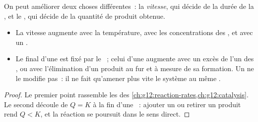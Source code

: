 On peut améliorer deux choses différentes~: la \emph{vitesse}, qui
décide de la durée de la , et le \emph{}, qui décide de
la quantité de produit obtenue.

\begin{proposition}\label{prop:g12:synthesis-strategy:levers}
\begin{itemize}
  \item La vitesse augmente avec la température, avec les concentrations
        des , et avec un .
  \item Le  final d'une  est fixé par le ~; celui d'une  augmente avec un excès
        de l'un des , ou avec l'élimination d'un produit au fur et
        à mesure de sa formation. Un  ne le modifie pas~: il ne
        fait qu'amener plus vite le système au même .
\end{itemize}
\end{proposition}

\begin{proof}
Le premier point rassemble les  des
\cref{ch:g12:reaction-rates,ch:g12:catalysis}. Le second découle de
$Q = K$ à la fin d'une ~: ajouter un  ou
retirer un produit rend $Q < K$, et la réaction se poursuit dans le sens
direct.
\end{proof}

